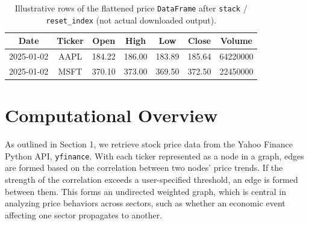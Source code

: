 \documentclass[fontsize=11pt]{article}
\begin{document}
\begin{table}[H]
    \centering
    \caption{Illustrative rows of the flattened price \texttt{DataFrame} after \texttt{stack} / \texttt{reset\_index} (not actual downloaded output).}
    \label{tab:flattened-prices}
    \begin{tabular}{|c|c|c|c|c|c|c|}
        \hline
        \textbf{Date} & \textbf{Ticker} & \textbf{Open} & \textbf{High} & \textbf{Low} & \textbf{Close} & \textbf{Volume} \\
        \hline
        2025-01-02 & AAPL & 184.22 & 186.00 & 183.89 & 185.64 & 64220000 \\
        2025-01-02 & MSFT & 370.10 & 373.00 & 369.50 & 372.50 & 22450000 \\
        \hline
    \end{tabular}
\end{table}

\section*{Computational Overview}
As outlined in Section 1, we retrieve stock price data from the Yahoo Finance Python API, \texttt{yfinance}. With each ticker represented as a node in a graph, edges are formed based on the correlation between two nodes' price trends. If the strength of the correlation exceeds a user-specified threshold, an edge is formed between them. This forms an undirected weighted graph, which is central in analyzing price behaviors across sectors, such as whether an economic event affecting one sector propagates to another.\\
\end{document}
